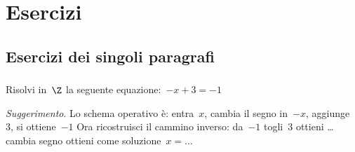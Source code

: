 
\section{Esercizi}

\subsection{Esercizi dei singoli paragrafi}

\subsubsection*{}

\begin{esercizio}
\label{ese:13.1}
Risolvi in~\(\Z\) la seguente equazione:~\(-x+3=-1\)

\emph{Suggerimento}. Lo schema operativo è: entra~\(x\), cambia il segno 
in~\(-x\), 
aggiunge~\(3\), si ottiene~\(-1\)
Ora ricostruisci il cammino inverso: da~\(-1\) togli~\(3\) ottieni \ldots 
cambia 
segno ottieni come soluzione~\(x = \ldots\)
\end{esercizio}

\subsubsection*{}

